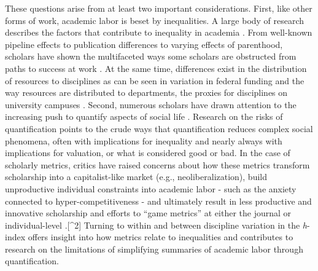 \documentclass[
  10pt,
  letterpaper,
]{article}
\begin{document}
These questions arise from at least two important considerations. First,
like other forms of work, academic labor is beset by inequalities. A
large body of research describes the factors that contribute to
inequality in academia \citep[see][ for
reviews]{fox_gender_2017, long_scientific_1995}. From well-known
pipeline effects to publication differences to varying effects of
parenthood, scholars have shown the multifaceted ways some scholars are
obstructed from paths to success at work \citep[e.g.][ among
others]{fox_gender_2005, grant_revisiting_2000, morgan_unequal_2021}. At
the same time, differences exist in the distribution of resources to
disciplines as can be seen in variation in federal funding and the way
resources are distributed to departments, the proxies for disciplines on
university campuses \citep{katz_metrics_2020}. Second, numerous scholars
have drawn attention to the increasing push to quantify aspects of
social life \citep{mennicken_what_2019}. Research on the risks of
quantification points to the crude ways that quantification reduces
complex social phenomena, often with implications for inequality and
nearly always with implications for valuation, or what is considered
good or bad. In the case of scholarly metrics, critics have raised
concerns about how these metrics transform scholarship into a
capitalist-like market (e.g., neoliberalization), build unproductive
individual constraints into academic labor - such as the anxiety
connected to hyper-competitiveness - and ultimately result in less
productive and innovative scholarship
\citep{edwards_academic_2017, muller_tyranny_2019} and efforts to ``game
metrics'' at either the journal or individual-level
\citep{siler_who_2022}.{[}\^{}2{]} Turning to within and between
discipline variation in the \emph{h}-index offers insight into how
metrics relate to inequalities and contributes to research on the
limitations of simplifying summaries of academic labor through
quantification.
\end{document}
